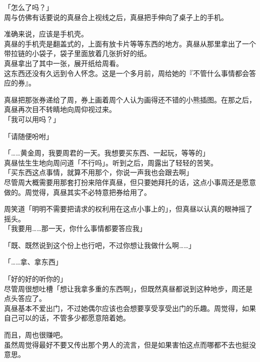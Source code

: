 「怎么了吗？」\\

周与仿佛有话要说的真昼合上视线之后，真昼把手伸向了桌子上的手机。

准确来说，应该是手机壳。\\

真昼的手机壳是翻盖式的，上面有放卡片等等东西的地方。真昼从那里拿出了一个带拉链的小袋子，袋子里面放着几张折好的纸。\\

真昼拿出了其中一张，展开纸给周看。\\

这东西还没有久远到令人怀念。这是一个多月前，周给她的『不管什么事情都会答应的券』。

真昼把那张券递给了周，券上画着周个人认为画得还不错的小熊插图。在那之后，真昼再次目不转睛地向周仰视过来。\\

「我可以用吗？」

「请随便吩咐」

「……黄金周，我要周君的一天。我想要买东西、一起玩，等等的」\\

真昼怯生生地向周问道「不行吗」。听到之后，周露出了轻轻的苦笑。\\

「买东西这点事情，就算不用那个，你说一声我也会跟去啊」\\

尽管周大概需要用那套打扮来陪伴真昼，但只要她拜托的话，这点小事周还是愿意做的。周觉得，真昼其实不必特意把券给用了。

周笑道「明明不需要把请求的权利用在这点小事上的」，但真昼以认真的眼神摇了摇头。\\

「我要用……那一天，你什么事情都要答应我」

「既、既然说到这个份上也行吧，不过你想让我做什么啊……」

「……拿、拿东西」

「好的好的听你的」\\

尽管周很想吐槽「想让我拿多重的东西啊」，但既然真昼都说到这种地步，周还是点头答应了。\\

真昼基本不爱出门，不过她偶尔应该也会想要享受享受出门的乐趣。周觉得，如果自己可以的话，不管多少都愿意陪着她。

而且，周也很赚吧。\\

虽然周觉得最好不要又传出那个男人的流言，但是如果害怕这点而哪都不去也挺没意思。\\

